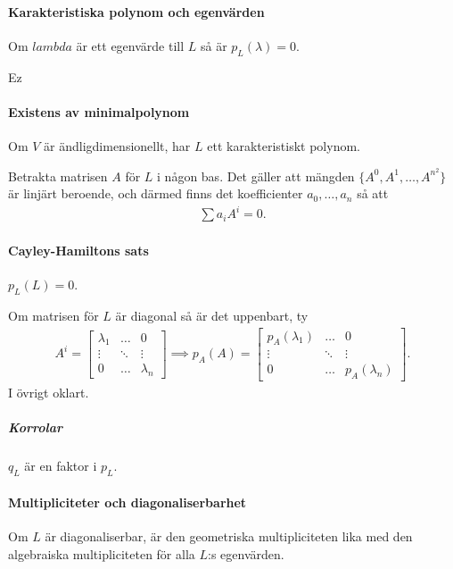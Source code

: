 \paragraph{Karakteristiska polynom och egenvärden}
Om $lambda$ är ett egenvärde till $L$ så är $p_{L}(\lambda) = 0$.

\proof
Ez

\paragraph{Existens av minimalpolynom}
Om $V$ är ändligdimensionellt, har $L$ ett karakteristiskt polynom.

\proof
Betrakta matrisen $A$ för $L$ i någon bas. Det gäller att mängden $\{A^{0}, A^{1}, \dots, A^{n^2}\}$ är linjärt beroende, och därmed finns det koefficienter $a_{0}, \dots, a_{n}$ så att
\begin{align*}
	\sum a_{i}A^{i} = 0.
\end{align*}

\paragraph{Cayley-Hamiltons sats}
$p_{L}(L) = 0$.

\proof
Om matrisen för $L$ är diagonal så är det uppenbart, ty
\begin{align*}
	A^{i} =
	\left[\begin{array}{ccc}
		\lambda_{1} & \dots  & 0 \\
		\vdots      & \ddots & \vdots \\
		0           & \dots  & \lambda_{n}
	\end{array}\right]
	\implies
	p_{A}(A) =
	\left[\begin{array}{ccc}
		p_{A}(\lambda_{1}) & \dots  & 0 \\
		\vdots             & \ddots & \vdots \\
		0                  & \dots  & p_{A}(\lambda_{n})
	\end{array}\right].
\end{align*}
I övrigt oklart.

\subparagraph{Korrolar}
$q_{L}$ är en faktor i $p_{L}$.

\paragraph{Multipliciteter och diagonaliserbarhet}
Om $L$ är diagonaliserbar, är den geometriska multipliciteten lika med den algebraiska multipliciteten för alla $L$:s egenvärden.

